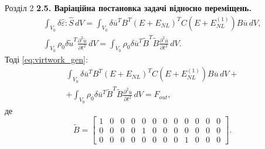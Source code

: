 \documentclass[8pt]{beamer}
\numberwithin{figure}{section}
\numberwithin{equation}{section}
\numberwithin{table}{section}
\begin{document}
\begin{frame}{Розділ 2}
\textbf{2.5. Варіаційна постановка задачі відносно переміщень.}
\begin{gather}
\int_{V_0} \delta\hat{\varepsilon}:\hat{S}\,dV=\int_{V_0} \delta\overline{u} ^T B ^T\left( E + E_{NL} \right)^T C \left( E + E_{NL}^{(1)} \right)B \overline{u} \, dV, \\ 
\int_{V_0} \rho_0 \delta\tilde{u} ^T \frac{\partial^2 \tilde{u}}{\partial t ^2}\,dV=\int_{V_0} \rho_0 \delta\overline{u} ^T \tilde{B}^T \tilde{B}\frac{\partial^2 \overline{u}}{\partial t ^2}\,dV.
\end{gather}
Тоді \eqref{eq:virtwork_gen}:
\begin{multline} \label{eq:virtwork_gen_u}
\int_{V_0} \delta\overline{u} ^T B ^T\left( E + E_{NL} \right)^T C \left( E + E_{NL}^{(1)} \right)B \overline{u} \, dV+\\+\int_{V_0} \rho_0 \delta\overline{u} ^T \tilde{B}^T \tilde{B}\frac{\partial^2 \overline{u}}{\partial t ^2}\,dV=F_{out},
\end{multline}
де
\[\tilde{B}=
\left[\begin{array}{cccccccccccc}
1 & 0 & 0 & 0 & 0 & 0 & 0 & 0 & 0 & 0 & 0 & 0\\
0 & 0 & 0 & 0 & 1 & 0 & 0 & 0 & 0 & 0 & 0 & 0\\
0 & 0 & 0 & 0 & 0 & 0 & 0 & 0 & 1 & 0 & 0 & 0
\end{array}\right].
\]


\end{frame}
\end{document}
